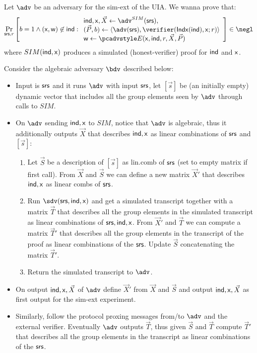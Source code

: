 \documentclass[runningheads,11pt]{llncs}
\let\spvec\vec \let\vec\accentvec
\let\vec\spvec
\begin{document}
Let $\adv$ be an adversary for the sim-ext of the UIA.
We wanna prove that:
\[
			\Prob[\srs,r]{
					b=1 \wedge (\inp,\wit)\not\in\ind:
					\begin{array}{l}
						\ind,\inp, \vec X \gets\adv^{SIM}(\srs),\\
					(\vec P,b) \gets \braket{\adv(\srs),\verifier(\Iphp(\ind),\inp;r)}\\
					\wit \gets \Ext(\inp,\ind,r,\vec X,\vec P)
					\end{array}
					}\in\negl
\]
where $SIM( {\mathsf{ind}},\mathsf{x} )$ produces a simulated (honest-verifier) proof for ${\mathsf{ind}}$ and $\mathsf{x}$.

Consider the algebraic adversary $\bdv$ described below:
\begin{itemize}
	\item Input is $\mathsf{srs}$ and it runs $\adv$ with input $\mathsf{srs}$, let $[\vec s]$ be (an
		initially empty)	dynamic vector that includes all the group elements seen by $\adv$ through calls to
		$SIM$.
	\item On $\adv$ sending ${\mathsf{ind}},\mathsf{x}$ to $SIM$, notice that $\adv$ is algebraic, thus it
		additionally outputs $\vec X$ that describes ${\mathsf{ind}},\mathsf{x}$ as linear combinations of
		$\mathsf{srs}$ and $[\vec s]$:
		\begin{enumerate}
			\item Let $\vec S$ be a description of $[\vec s]$ as lin.comb of $\mathsf{srs}$ (set to empty
				matrix if first call).
				From $\vec X$ and $\vec S$ we can define a new matrix $\vec X'$ that describes
				${\mathsf{ind}},\mathsf{x}$ as linear combs of $\mathsf{srs}$.
			\item Run $\sdv(\srs,\ind,\inp)$ and get a simulated transcript together with a matrix $\vec T$
				 that describes all the group elements in the simulated transcript as linear combinations of $\mathsf{srs},{\mathsf{ind}},\mathsf{x}$.
					From $\vec X'$ and $\vec T$ we can compute a matrix $\vec T'$ that describes all
					the group elements in the transcript of the proof as linear combinations of the
					$\mathsf{srs}$. Update $\vec S$ concatenating the matrix $\vec T'$.
			\item Return the simulated transcript to $\adv$.
		\end{enumerate}
	\item On output $\ind,\inp,\vec X$ of $\adv$ define $\vec X'$ from $\vec X$ and $\vec S$
		and output $\ind,\inp,\vec X$ as first output for the sim-ext experiment.
	\item Similarly, follow the protocol proxing messages from/to $\adv$ and the external verifier.
		Eventually $\adv$ outputs $\vec T$, thus given $\vec S$ and $\vec T$ compute $\vec T'$
		that describes all the group elements in the transcript as linear combinations of the
		$\mathsf{srs}$.
\end{itemize}
\end{document}

